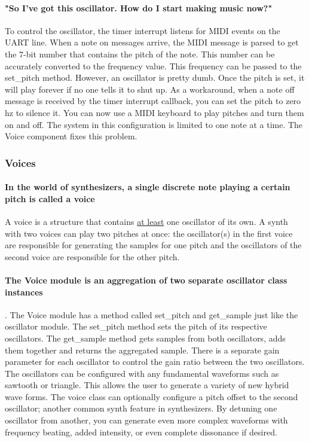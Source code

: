 \documentclass[acmlarge,screen]{acmart}
\begin{document}
	\paragraph{"So I've got this oscillator. How do I start making music now?"} To control the oscillator, the timer interrupt listens for MIDI events on the UART line. When a note on messages arrive, the MIDI message is parsed to get the 7-bit number that contains the pitch of the note. This number can be accurately converted to the frequency value. This frequency can be passed to the set\_pitch method. However, an oscillator is pretty dumb. Once the pitch is set, it will play forever if no one tells it to shut up. As a workaround, when a note off message is received by the timer interrupt callback, you can set the pitch to zero hz to silence it. You can now use a MIDI keyboard to play pitches and turn them on and off. The system in this configuration is limited to one note at a time. The Voice component fixes this problem.
	
	\subsubsection{Voices}
	\paragraph{In the world of synthesizers, a single discrete note playing a certain pitch is called a voice} A voice is a structure that contains \underline{at least} one oscillator of its own. A synth with two voices can play two pitches at once: the oscillator(s) in the first voice are responsible for generating the samples for one pitch and the oscillators of the second voice are responsible for the other pitch.
	
	\paragraph{The Voice module is an aggregation of two separate oscillator class instances}. The Voice module has a method called set\_pitch and get\_sample just like the oscillator module. The set\_pitch method sets the pitch of its respective oscillators. The get\_sample method gets samples from both oscillators, adds them together and returns the aggregated sample. There is a separate gain parameter for each oscillator to control the gain ratio between the two oscillators. The oscillators can be configured with any fundamental waveforms such as sawtooth or triangle. This allows the user to generate a variety of new hybrid wave forms. The voice class can optionally configure a pitch offset to the second oscillator; another common synth feature in synthesizers. By detuning one oscillator from another, you can generate even more complex waveforms with frequency beating, added intensity, or even complete dissonance if desired.
	
\end{document}
